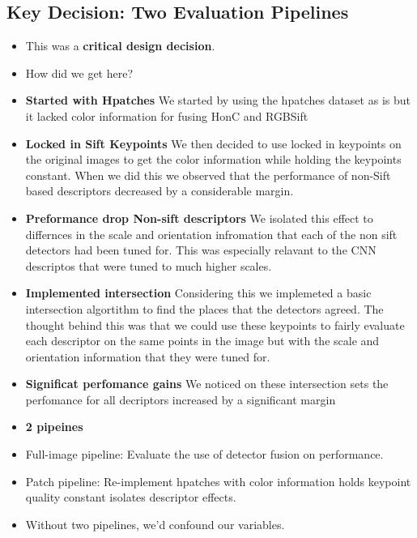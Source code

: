 \documentclass[11pt, letterpaper]{article}
\begin{document}
\subsection{Key Decision: Two Evaluation Pipelines}
\begin{itemize}
  \item This was a \textbf{critical design decision}.
  \item How did we get here?
  \item \textbf{Started with Hpatches} We started by using the hpatches dataset as is but it lacked color information for fusing HonC and RGBSift
  \item \textbf{Locked in Sift Keypoints} We then decided to use locked in keypoints on the original images to get the color information while holding the keypoints constant. When we did this we observed that the performance of non-Sift based descriptors decreased by a considerable margin.
  \item \textbf{Preformance drop Non-sift descriptors} We isolated this effect to differnces in the scale and orientation infromation that each of the non sift detectors had been tuned for. This was especially relavant to the CNN descriptos that were tuned to much higher scales.
  \item \textbf{Implemented intersection} Considering this we implemeted a basic intersection algortithm to find the places that the detectors agreed. The thought behind this was that we could use these keypoints to fairly evaluate each descriptor on the same points in the image but with the scale and orientation information that they were tuned for.
  \item \textbf{Significat perfomance gains} We noticed on these intersection sets the perfomance for all decriptors increased by a significant margin
  \item \textbf{2 pipeines}
  \item Full-image pipeline: Evaluate the use of detector fusion on performance.
  \item Patch pipeline: Re-implement hpatches with color information holds keypoint quality constant isolates descriptor effects.
  \item Without two pipelines, we'd confound our variables.
\end{itemize}

\end{document}
